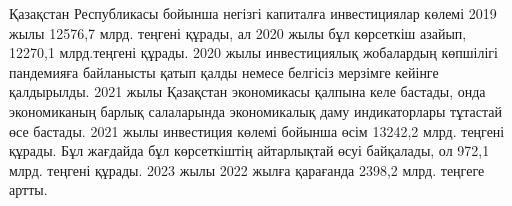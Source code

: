 
\begin{multicols}{2}
Қазақстан Республикасы бойынша негізгі капиталға инвестициялар көлемі
2019 жылы 12576,7 млрд. теңгені құрады, ал 2020 жылы бұл көрсеткіш
азайып, 12270,1 млрд.теңгені құрады. 2020 жылы инвестициялық жобалардың
көпшілігі пандемияға байланысты қатып қалды немесе белгісіз мерзімге
кейінге қалдырылды. 2021 жылы Қазақстан экономикасы қалпына келе
бастады, онда экономиканың барлық салаларында экономикалық даму
индикаторлары тұтастай өсе бастады. 2021 жылы инвестиция көлемі бойынша
өсім 13242,2 млрд. теңгені құрады. Бұл жағдайда бұл көрсеткіштің
айтарлықтай өсуі байқалады, ол 972,1 млрд. теңгені құрады. 2023 жылы
2022 жылға қарағанда 2398,2 млрд. теңгеге артты.
\end{multicols}

